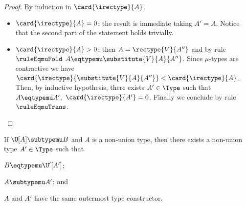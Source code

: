 \begin{proof}
By induction in $\card{\irectype}{A}$.
\begin{itemize}
  \item $\card{\irectype}{A} = 0$: the result is immediate taking $A' = A$.
  Notice that the second part of the statement holds trivially.
  
  \item $\card{\irectype}{A} > 0$: then $A = \rectype{V}{A''}$ and by rule
  $\ruleEqmuFold$ $A \eqtypemu \substitute{V}{A}{A''}$. Since $\mu$-types are
  contractive we have $\card{\irectype}{\substitute{V}{A}{A''}} <
  \card{\irectype}{A}$. Then, by inductive hypothesis, there exists $A' \in
  \Type$ such that $A \eqtypemu A'$, $\card{\irectype}{A'} = 0$. Finally we
  conclude by rule $\ruleEqmuTrans$.
\end{itemize}
\end{proof}




\begin{lemma}\label{lem:supertypesOfNonUnionTypes}
If $\U[A] \subtypemu B$ and $A$ is a non-union type, then there exists a
non-union type $A' \in \Type$ such that
\begin{inparaenum}[(i)]
  \item $B \eqtypemu \U'[A']$;
  \item $A \subtypemu A'$; and
  \item $A$ and $A'$ have the same outermost type constructor.
\end{inparaenum}
\end{lemma}



